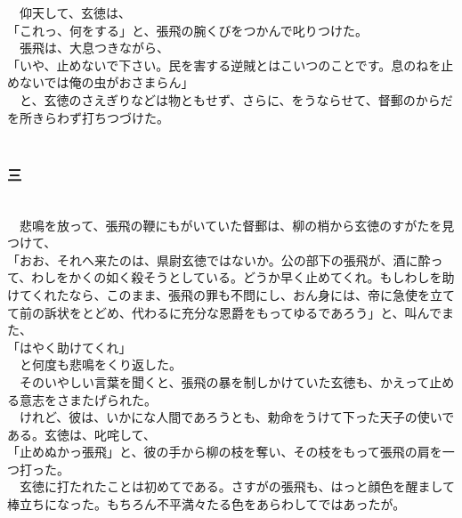 \documentclass[
  paper=a5,
  fontsize=10pt,
  jafontsize=9.5pt,
  tate,                  %
  open_bracket_pos=nibu, %
]{jlreq}
\begin{document}
　仰天して、玄徳は、\\


「これっ、何をする」と、張飛の腕くびをつかんで叱りつけた。\\


　張飛は、大息つきながら、\\


「いや、止めないで下さい。民を害する逆賊とはこいつのことです。息のねを止めないでは俺の虫がおさまらん」\\


　と、玄徳のさえぎりなどは物ともせず、さらに、をうならせて、督郵のからだを所きらわず打ちつづけた。\\

\\

\subsubsection{三}

\\


　悲鳴を放って、張飛の鞭にもがいていた督郵は、柳の梢から玄徳のすがたを見つけて、\\


「おお、それへ来たのは、県尉玄徳ではないか。公の部下の張飛が、酒に酔って、わしをかくの如く殺そうとしている。どうか早く止めてくれ。もしわしを助けてくれたなら、このまま、張飛の罪も不問にし、おん身には、帝に急使を立てて前の訴状をとどめ、代わるに充分な恩爵をもってゆるであろう」と、叫んでまた、\\


「はやく助けてくれ」\\


　と何度も悲鳴をくり返した。\\


　そのいやしい言葉を聞くと、張飛の暴を制しかけていた玄徳も、かえって止める意志をさまたげられた。\\


　けれど、彼は、いかにな人間であろうとも、勅命をうけて下った天子の使いである。玄徳は、叱咤して、\\


「止めぬかっ張飛」と、彼の手から柳の枝を奪い、その枝をもって張飛の肩を一つ打った。\\


　玄徳に打たれたことは初めてである。さすがの張飛も、はっと顔色を醒まして棒立ちになった。もちろん不平満々たる色をあらわしてではあったが。\\
\end{document}
